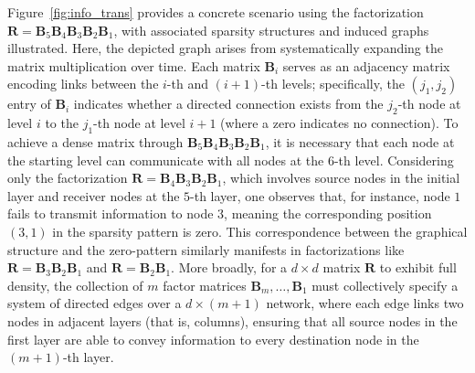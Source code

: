 Figure~\ref{fig:info_trans} provides a concrete scenario using the factorization $\bm{R}=\bm{B}_5\bm{B}_4\bm{B}_3\bm{B}_2\bm{B}_1$, with associated sparsity structures and induced graphs illustrated. Here, the depicted graph arises from systematically expanding the matrix multiplication over time. Each matrix $\bm{B}_i$ serves as an adjacency matrix encoding links between the $i$-th and $(i+1)$-th levels; specifically, the $(j_1,j_2)$ entry of $\bm{B}_i$ indicates whether a directed connection exists from the $j_2$-th node at level $i$ to the $j_1$-th node at level $i+1$ (where a zero indicates no connection). To achieve a dense matrix through $\bm{B}_5\bm{B}_4\bm{B}_3\bm{B}_2\bm{B}_1$, it is necessary that each node at the starting level can communicate with all nodes at the $6$-th level. Considering only the factorization $\bm{R}=\bm{B}_4\bm{B}_3\bm{B}_2\bm{B}_1$, which involves source nodes in the initial layer and receiver nodes at the $5$-th layer, one observes that, for instance, node $1$ fails to transmit information to node $3$, meaning the corresponding position $(3,1)$ in the sparsity pattern is zero. This correspondence between the graphical structure and the zero-pattern similarly manifests in factorizations like $\bm{R}=\bm{B}_3\bm{B}_2\bm{B}_1$ and $\bm{R}=\bm{B}_2\bm{B}_1$. More broadly, for a $d\times d$ matrix $\bm{R}$ to exhibit full density, the collection of $m$ factor matrices $\bm{B}_m,\ldots,\bm{B}_1$ must collectively specify a system of directed edges over a $d\times (m+1)$ network, where each edge links two nodes in adjacent layers (that is, columns), ensuring that all source nodes in the first layer are able to convey information to every destination node in the $(m+1)$-th layer.

